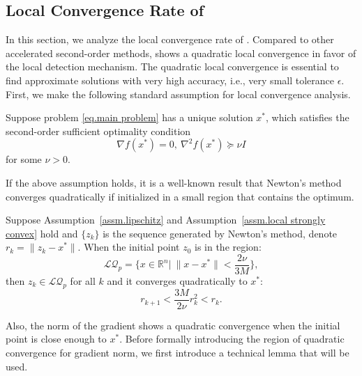 \documentclass{mcom-l}
\numberwithin{equation}{section}
\begin{document}
\subsection{Local Convergence Rate of }
\label{sec.local}
In this section, we analyze the local convergence rate of . Compared to other accelerated second-order methods,  shows a quadratic local convergence in favor of the local detection mechanism. The quadratic local convergence is essential to find approximate solutions with very high accuracy, i.e., very small tolerance $\epsilon$. First, we make the following standard assumption for local convergence analysis.
\begin{assumption}
    \label{assm.local strongly convex}
    Suppose problem \eqref{eq.main problem} has a unique solution $x^*$, which satisfies the second-order sufficient optimality condition
    \begin{equation}
        \label{eq.second-order suff cond}
        \nabla f(x^*)=0, \ \nabla^2 f(x^*)\succeq \nu I
    \end{equation}
    for some $\nu >0$.
\end{assumption}
If the above assumption holds, it is a well-known result that Newton's method converges quadratically if initialized in a small region that contains the optimum.
\begin{lemma}
    \label{lem.quadratic point}
    Suppose Assumption~\ref{assm.lipschitz} and Assumption~\ref{assm.local strongly convex} hold and $\{z_k\}$ is the sequence generated by Newton's method, denote $r_k = \|z_k-x^*\|$. When the initial point $z_0$ is in the region:
    \begin{equation}
        \label{eq.local quadratic region}
        \mathcal{LQ}_p = \{x\in\mathbb{R}^n| \ \|x-x^*\| < \frac{2\nu}{3M}\},
    \end{equation}
    then $z_k \in \mathcal{LQ}_p$ for all $k$ and it converges quadratically to $x^*$:
    \begin{equation}
        \label{eq.quadratic convergence}
        r_{k+1} < \frac{3M}{2\nu}r_k^2<r_k.
    \end{equation}
\end{lemma}
Also, the norm of the gradient shows a quadratic convergence when the initial point is close enough to $x^*$. Before formally introducing the region of quadratic convergence for gradient norm, we first introduce a technical lemma that will be used.
\end{document}
